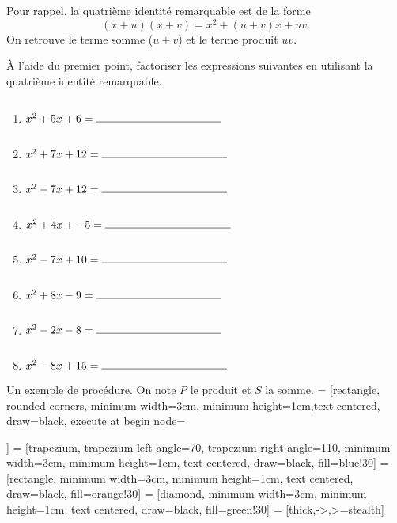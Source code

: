 \documentclass[a4paper,12pt]{article}
\begin{document}
\begin{activite}
\begin{tasks}
	\vspace{15pt}
\end{tasks}
Pour rappel, la quatrième identité remarquable est de la forme
\[(x+u)(x+v)=x^2+(u+v)x+uv.\]
On retrouve le terme somme ($u+v$) et le terme produit $uv$.
\begin{tasks}
	\task[c)] À l'aide du premier point, factoriser les expressions suivantes en utilisant la quatrième identité remarquable.
\begin{multicols}{2}
\begin{enumerate}
\item $x^2+5x+6=\ligne{4}$ 
\item $x^2+7x+12=\ligne{4}$
\item $x^2-7x+12=\ligne{4}$
\item $x^2+4x+-5=\ligne{4}$
\item $x^2-7x+10=\ligne{4}$
\item $x^2+8x-9=\ligne{4}$
\item $x^2-2x-8=\ligne{4}$
\item $x^2-8x+15=\ligne{4}$
\end{enumerate}
\end{multicols}

Un exemple de procédure. On note $P$ le produit et $S$ la somme. 
 = [rectangle, rounded corners, minimum width=3cm, minimum height=1cm,text centered, draw=black,
execute at begin node={\begin{varwidth}{15em}},
execute at end node={\end{varwidth}}]
 = [trapezium, trapezium left angle=70, trapezium right angle=110, minimum width=3cm, minimum height=1cm, text centered, draw=black, fill=blue!30]
 = [rectangle, minimum width=3cm, minimum height=1cm, text centered, draw=black, fill=orange!30]
 = [diamond, minimum width=3cm, minimum height=1cm, text centered, draw=black, fill=green!30]
 = [thick,->,>=stealth]
\begin{center}
\end{center}


\end{tasks}
\end{activite}
\end{document}
